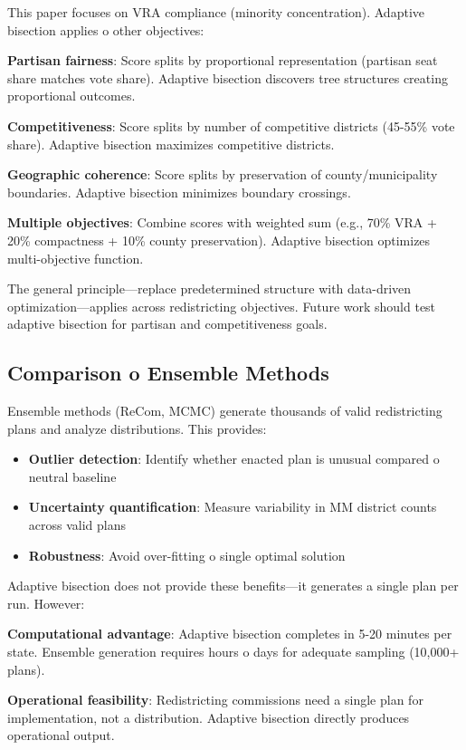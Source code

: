 This paper focuses on VRA compliance (minority concentration). Adaptive bisection applies 	o other objectives:

\textbf{Partisan fairness}: Score splits by proportional representation (partisan seat share matches vote share). Adaptive bisection discovers tree structures creating proportional outcomes.

\textbf{Competitiveness}: Score splits by number of competitive districts (45-55\% vote share). Adaptive bisection maximizes competitive districts.

\textbf{Geographic coherence}: Score splits by preservation of county/municipality boundaries. Adaptive bisection minimizes boundary crossings.

\textbf{Multiple objectives}: Combine scores with weighted sum (e.g., 70\% VRA + 20\% compactness + 10\% county preservation). Adaptive bisection optimizes multi-objective function.

The general principle—replace predetermined structure with data-driven optimization—applies across redistricting objectives. Future work should test adaptive bisection for partisan and competitiveness goals.

\subsection{Comparison 	o Ensemble Methods}

Ensemble methods (ReCom, MCMC) generate thousands of valid redistricting plans and analyze distributions. This provides:
\begin{itemize}
\item \textbf{Outlier detection}: Identify whether enacted plan is unusual compared 	o neutral baseline
\item \textbf{Uncertainty quantification}: Measure variability in MM district counts across valid plans
\item \textbf{Robustness}: Avoid over-fitting 	o single optimal solution
\end{itemize}

Adaptive bisection does not provide these benefits—it generates a single plan per run. However:

\textbf{Computational advantage}: Adaptive bisection completes in 5-20 minutes per state. Ensemble generation requires hours 	o days for adequate sampling (10,000+ plans).

\textbf{Operational feasibility}: Redistricting commissions need a single plan for implementation, not a distribution. Adaptive bisection directly produces operational output.

